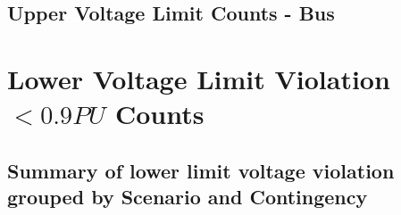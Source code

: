 \documentclass[10pt]{report}
\begin{document}
\subsection{Upper Voltage Limit Counts - Bus}

\begin{table}[H]
\caption{Upper Voltage Limit Counts - Bus}
\label{count_high_bus}
\centering
{}
\end{table}

\section{Lower Voltage Limit Violation $ < 0.9 PU $ Counts}
\subsection{Summary of lower limit voltage violation grouped by Scenario and Contingency}
\end{document}
